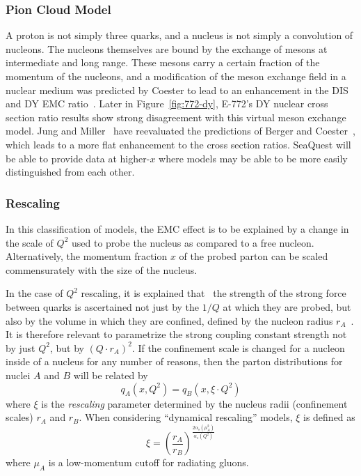 \subsubsection{Pion Cloud Model}

A proton is not simply three quarks, and a nucleus is not simply a convolution of nucleons. The nucleons themselves are bound by the exchange of mesons at intermediate and long range. These mesons carry a certain fraction of the momentum of the nucleons, and a modification of the meson exchange field in a nuclear medium was predicted by Coester to lead to an enhancement in the DIS and DY EMC ratio~\cite{Berger:1985dr}. Later in Figure~\ref{fig:772-dy}, E-772's DY nuclear cross section ratio results show strong disagreement with this virtual meson exchange model. Jung and Miller~\cite{Jung:1990pu} have reevaluated the predictions of Berger and Coester~\cite{Berger:1985dr}, which leads to a more flat enhancement to the cross section ratios. SeaQuest will be able to provide data at higher-$x$ where models may be able to be more easily distinguished from each other.

\subsubsection{Rescaling}

In this classification of models, the EMC effect is to be explained by a change in the scale of $Q^2$ used to probe the nucleus as compared to a free nucleon. Alternatively, the momentum fraction $x$ of the probed parton can be scaled commensurately with the size of the nucleus.

In the case of $Q^2$ rescaling, it is explained that~\cite{Rith:2014tma} the strength of the strong force between quarks is ascertained not just by the $1/Q$ at which they are probed, but also by the volume in which they are confined, defined by the nucleon radius $r_A$~\cite{Close:1983tn, Nachtmann:1983py}.  It is therefore relevant to parametrize the strong coupling constant strength not by just $Q^2$, but by $(Q\cdot r_A)^2$.  If the confinement scale is changed for a nucleon inside of a nucleus for any number of reasons, then the parton distributions for nuclei $A$ and $B$ will be related by
\begin{equation}
q_A(x,Q^2) = q_B(x,\xi\cdot Q^2)
\end{equation}
where $\xi$ is the \emph{rescaling} parameter determined by the nucleus radii (confinement scales) $r_A$ and $r_B$. When considering ``dynamical rescaling'' models, $\xi$ is defined as
\begin{equation}
\xi = \left(\frac{r_A}{r_B}\right)^{\frac{2\alpha_s (\mu_A^2)}{\alpha_s(Q^2)}}
\end{equation}
where $\mu_A$ is a low-momentum cutoff for radiating gluons.

